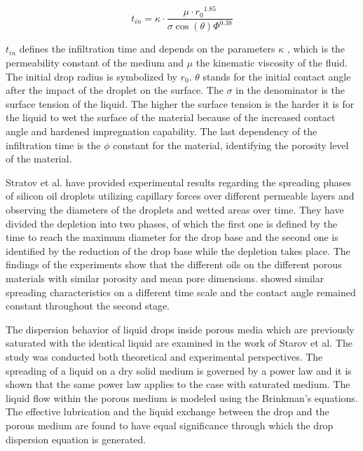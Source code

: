 \begin{equation}\label{eq:InfTime}
t_{in}=\kappa \cdotp {\frac{\mu \cdotp r{_0}^{1.85}}{\sigma \cos({\theta})\varPhi^{0.38}}}
\end{equation}

\bigskip

$t_{in}$ defines the infiltration time and depends on the parameters $\kappa$ , which is the permeability constant of the medium and $\mu$ the kinematic viscosity of the fluid. The initial drop radius is symbolized by $r_{0}$. $\theta$ stands for the initial contact angle after the impact of the droplet on the surface. The $\sigma$ in the denominator is the surface tension of the liquid. The higher the surface tension is the harder it is for the liquid to wet the surface of the material because of the increased contact angle and hardened impregnation capability. The last dependency of the infiltration time is  the $\phi$ constant for the material, identifying the porosity level of the material. \citep{markicevic2009infiltration}

Stratov et al. have provided experimental results regarding  the spreading phases of silicon oil droplets utilizing capillary forces over different permeable layers and observing the diameters of the droplets and wetted areas over time. They have divided the depletion into two phases, of which the first one is defined by the time to reach the maximum diameter for the drop base and the second one is identified by the reduction of the drop base while the depletion takes place. The findings of the experiments show that the different oils on the different porous materials with similar porosity and mean pore dimensions. showed similar spreading characteristics on a different time scale and the contact angle remained constant throughout the second stage.\citep{starov2002thick}

The dispersion behavior of liquid drops inside porous media which are previously saturated with the identical liquid are examined in the work of Starov et al. The study was conducted both theoretical and experimental perspectives. The spreading of a liquid on a dry solid medium is governed by a power law and it is shown that the same power law applies to the case with saturated medium. The liquid flow within the porous medium is modeled using the Brinkman’s equations. The effective lubrication and the liquid exchange between the drop and the porous medium are found to have equal significance through which the drop dispersion equation is generated. \citep{starov2002saturated}
\bigskip

